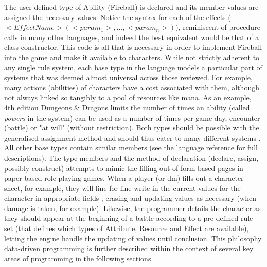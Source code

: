 The user-defined type of Ability (Fireball) is declared and its member values are assigned the necessary values. Notice the syntax for each of the effects ($<EffectName>(<param_1>,...,<param_n>)$), reminiscent of procedure calls in many other languages, and indeed the best equivalent would be that of a class constructor. This code is all that is necessary in order to implement Fireball into the game and make it available to characters.
While not strictly adherent to any single rule system, each base type in the language models a particular part of systems that was deemed almost universal across those reviewed. For example, many actions (abilities) of characters have a cost associated with them, although not always linked so tangibly to a pool of resources like mana. As an example, 4th edition Dungeons \& Dragons limits the number of times an ability (called \emph{powers} in the system) can be used as a number of times per game day, encounter (battle) or "at will" (without restriction). Both types should be possible with the generalised assignment method and should thus cater to many different systems . All other base types contain similar members (see the language reference for full descriptions).
The type members and the method of declaration (declare, assign, possibly construct) attempts to mimic the filling out of form-based pages in paper-based role-playing games. When a player (or \ac{dm}) fills out a character sheet, for example, they will line for line write in the current values for the character in appropriate fields , erasing and updating values as necessary (when damage is taken, for example). Likewise, the programmer details the character as they should appear at the beginning of a battle according to a pre-defined rule set (that defines which types of Attribute, Resource and Effect are available), letting the engine handle the updating of values until conclusion.
This philosophy data-driven programming is further described within the context of several key areas of programming in the following sections.

